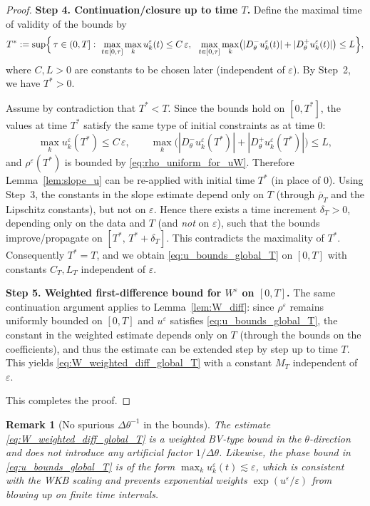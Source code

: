 \documentclass[11pt, dina4, amsfont12]{article}
\newtheorem{remark}{Remark}[section]
\begin{document}
\begin{proof}
\medskip
\noindent
\textbf{Step 4. Continuation/closure up to time $T$.}
Define the maximal time of validity of the bounds by
\[
T^\ast:=\sup\Bigl\{\,\tau\in(0,T]:
\ \max_{t\in[0,\tau]}\max_k u_k^\varepsilon(t)\le C\,\varepsilon,\ \ 
\max_{t\in[0,\tau]}\max_k\bigl(|D_\theta^-u_k^\varepsilon(t)|+|D_\theta^+u_k^\varepsilon(t)|\bigr)\le L
\Bigr\},
\]
where $C,L>0$ are constants to be chosen later (independent of $\varepsilon$).
By Step~2, we have $T^\ast>0$.

Assume by contradiction that $T^\ast<T$. Since the bounds hold on $[0,T^\ast]$,
the values at time $T^\ast$ satisfy the same type of initial constraints as at time $0$:
\[
\max_k u_k^\varepsilon(T^\ast)\le C\,\varepsilon,
\qquad
\max_k\Big(|D_\theta^-u_k^\varepsilon(T^\ast)|+|D_\theta^+u_k^\varepsilon(T^\ast)|\Big)\le L,
\]
and $\rho^\varepsilon(T^\ast)$ is bounded by \eqref{eq:rho_uniform_for_uW}.
Therefore Lemma~\ref{lem:slope_u} can be re-applied with initial time $T^\ast$
(in place of $0$). Using Step~3, the constants in the slope estimate depend only on
$T$ (through $\overline\rho_T$ and the Lipschitz constants), but not on $\varepsilon$.
Hence there exists a time increment $\delta_T>0$, depending only on the data and $T$
(and \emph{not} on $\varepsilon$), such that the bounds improve/propagate on
$[T^\ast,\,T^\ast+\delta_T]$. This contradicts the maximality of $T^\ast$.
Consequently $T^\ast=T$, and we obtain \eqref{eq:u_bounds_global_T} on $[0,T]$
with constants $C_T,L_T$ independent of $\varepsilon$.

\medskip
\noindent
\textbf{Step 5. Weighted first-difference bound for $W^\varepsilon$ on $[0,T]$.}
The same continuation argument applies to Lemma~\ref{lem:W_diff}:
since $\rho^\varepsilon$ remains uniformly bounded on $[0,T]$ and $u^\varepsilon$
satisfies \eqref{eq:u_bounds_global_T}, the constant in the weighted estimate
depends only on $T$ (through the bounds on the coefficients), and thus the estimate
can be extended step by step up to time $T$. This yields \eqref{eq:W_weighted_diff_global_T}
with a constant $M_T$ independent of $\varepsilon$.

This completes the proof.
\end{proof}

\begin{remark}[No spurious $\Delta\theta^{-1}$ in the bounds]\label{rem:no_inv_dtheta}
The estimate \eqref{eq:W_weighted_diff_global_T} is a weighted BV-type bound in the
$\theta$-direction and does \emph{not} introduce any artificial factor $1/\Delta\theta$.
Likewise, the phase bound in \eqref{eq:u_bounds_global_T} is of the form
$\max_k u_k^\varepsilon(t)\lesssim \varepsilon$, which is consistent with the
WKB scaling and prevents exponential weights $\exp(u^\varepsilon/\varepsilon)$ from
blowing up on finite time intervals.
\end{remark}
\end{document}
